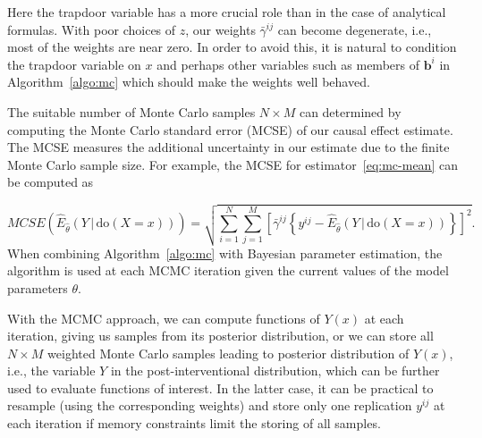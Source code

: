 \documentclass[11pt,a4paper,twoside]{article}
\newcommand{\+}[1]{\ensuremath{\mathbf{#1}}}
\newcommand{\po}[2]{#1(#2)}
\newcommand{\doo}{\textrm{do}}
\newcommand{\given}{{ \, | \, }}
\begin{document}
Here the trapdoor variable has a more crucial role than in the case of analytical formulas. With poor choices of $z$, our weights $\bar \gamma^{ij}$ can become degenerate, i.e., most of the weights are near zero. In order to avoid this, it is natural to condition the trapdoor variable on $x$ and perhaps other variables such as members of $\+ b^i$ in Algorithm~\ref{algo:mc} which should make the weights well behaved.

The suitable number of Monte Carlo samples $N \times M$ can determined by computing the Monte Carlo standard error (MCSE) of our causal effect estimate. The MCSE measures the additional uncertainty in our estimate due to the finite Monte Carlo sample size. For example, the MCSE for estimator~\eqref{eq:mc-mean} can be computed as

\begin{equation*}
MCSE\left(\widehat E_{\hat \theta}(Y \given \doo(X = x))\right) = \sqrt{\sum_{i=1}^N\sum_{j=1}^M\left[\bar \gamma^{ij} \left\{y^{ij} - \widehat E_{\hat \theta}(Y \given \doo(X = x))\right\}\right]^2}.
\end{equation*} 
When combining Algorithm~\ref{algo:mc} with Bayesian parameter estimation, the algorithm is used at each MCMC iteration given the current values of the model parameters $\theta$. 
	
With the MCMC approach, we can compute functions of $\po{Y}{x}$ at each iteration, giving us samples from its posterior distribution, or we can store all $N \times M$ weighted Monte Carlo samples leading to posterior distribution of $\po{Y}{x}$, i.e., the variable $Y$ in the post-interventional distribution, which can be further used to evaluate functions of interest. In the latter case, it can be practical to resample (using the corresponding weights) and store only one replication $y^{ij}$ at each iteration if memory constraints limit the storing of all samples.
	

	

	
\end{document}

